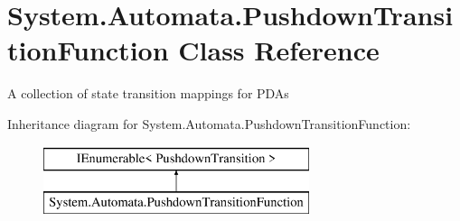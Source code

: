 \hypertarget{class_system_1_1_automata_1_1_pushdown_transition_function}{}\section{System.\+Automata.\+Pushdown\+Transition\+Function Class Reference}
\label{class_system_1_1_automata_1_1_pushdown_transition_function}


A collection of state transition mappings for P\+D\+As  


Inheritance diagram for System.\+Automata.\+Pushdown\+Transition\+Function\+:\begin{figure}[H]
\begin{center}
\leavevmode
\includegraphics[height=2.000000cm]{class_system_1_1_automata_1_1_pushdown_transition_function}
\end{center}
\end{figure}

